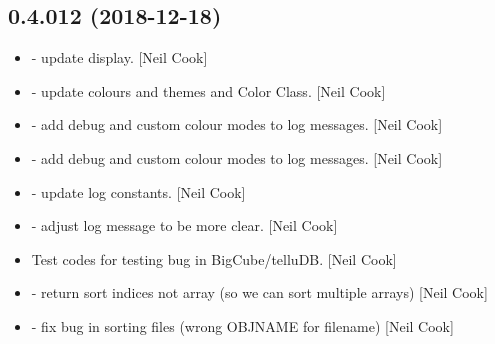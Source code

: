 \documentclass[a4paper,10pt,english]{report}
\begin{document}
\subsection{0.4.012 (2018-12-18)}
\label{\detokenize{misc/changelog:id228}}\begin{itemize}
\item {} 
 - update display. {[}Neil Cook{]}

\item {} 
 - update colours and themes and Color Class. {[}Neil
Cook{]}

\item {} 
 - add debug and custom colour modes to log messages.
{[}Neil Cook{]}

\item {} 
 - add debug and custom colour modes to log messages.
{[}Neil Cook{]}

\item {} 
 - update log constants. {[}Neil Cook{]}

\item {} 
 - adjust log message to be more clear. {[}Neil
Cook{]}

\item {} 
Test codes for testing bug in BigCube/telluDB. {[}Neil Cook{]}

\item {} 
 - return sort indices not array (so we can
sort multiple arrays) {[}Neil Cook{]}

\item {} 
 - fix bug in sorting files (wrong OBJNAME for
filename) {[}Neil Cook{]}

\end{itemize}
\end{document}
